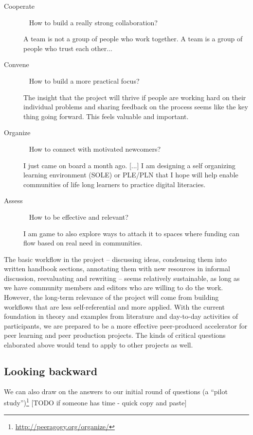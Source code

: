\documentclass{acm_proc_article-sp}
\newenvironment{cframed}[1][blue]
  {\def\FrameCommand{\fboxsep=\FrameSep\fcolorbox{#1}{white}}%
    \MakeFramed {\advance\hsize-\width \FrameRestore}}
  {\endMakeFramed}
\begin{document}
\begin{description}
\item[Cooperate] ~ How to build a really strong collaboration?

A team is not a group of people who work together. A team is a group of people who trust each other...

\item[Convene] ~ How to build a more practical focus?

The insight that the project will thrive if people are working hard on their individual problems and sharing feedback on the process seems like the key thing going forward. This feels valuable and important.

\item[Organize] ~ How to connect with motivated newcomers?

I just came on board a month ago. [...] I am designing a self organizing learning environment (SOLE) or PLE/PLN that I hope will help enable communities of life long learners to practice digital literacies.

\item[Assess] ~ How to be effective and relevant?

I am game to also explore ways to attach it to spaces where funding can flow based on real need in communities.
\end{description}

The basic workflow in the project -- discussing ideas, condensing them into written handbook sections, annotating them with new resources in informal discussion, reevaluating and rewriting -- seems relatively sustainable, as long as we have community members and editors who are willing to do the work. However, the long-term relevance of the project will come from building workflows that are less self-referential and more applied. With the current foundation in theory and examples from literature and day-to-day activities of participants, we are prepared to be a more effective peer-produced accelerator for peer learning and peer production projects. The kinds of critical questions elaborated above would tend to apply to other projects as well.

\begin{cframed}[scarlet]
\subsection{Looking backward}

We can also draw on the answers to our initial round of questions (a
``pilot study'')\footnote{\url{http://peeragogy.org/organize/}} [TODO
  if someone has time - quick copy and paste]
\end{cframed}
\end{document}
